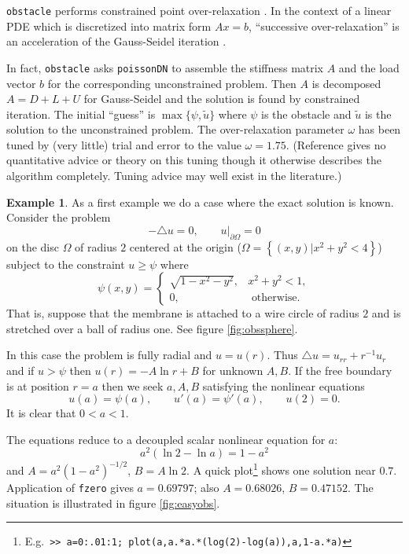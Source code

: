 \documentclass[12pt,final]{amsart}
\newcommand{\mtt}{\texttt}
\theoremstyle{definition}
\newtheorem{example}{Example}
\newcommand{\lap}{\triangle}
\begin{document}
\mtt{obstacle} performs constrained point over-relaxation \cite{GLT}.  In the context of a linear PDE which is discretized into matrix form $Ax=b$, ``successive over-relaxation'' is an acceleration of the Gauss-Seidel iteration \cite{BurdenFaires}.

In fact, \mtt{obstacle} asks \mtt{poissonDN} to assemble the stiffness matrix $A$ and the load vector $b$ for the corresponding unconstrained problem.  Then $A$ is decomposed $A=D+L+U$ for Gauss-Seidel and the solution is found by constrained iteration.  The initial ``guess'' is $\max\{\psi,\tilde u\}$ where $\psi$ is the obstacle and $\tilde u$ is the solution to the unconstrained problem.  The over-relaxation parameter $\omega$ has been tuned by (very little) trial and error to the value $\omega=1.75$.  (Reference \cite{GLT} gives no quantitative advice or theory on this tuning though it otherwise describes the algorithm completely.  Tuning advice may well exist in the literature.)

\begin{example}  As a first example we do a case where the exact solution is known.  Consider the problem
    $$-\lap u = 0, \qquad u\big|_{\partial\Omega} = 0$$
on the disc $\Omega$ of radius $2$ centered at the origin ($\Omega = \left\{(x,y) \big| x^2+y^2<4\right\}$) subject to the constraint $u\ge \psi$ where
    $$\psi(x,y) = \begin{cases} \sqrt{1-x^2-y^2}, & x^2+y^2 <1, \\ 0, & \text{ otherwise.}\end{cases}$$
That is, suppose that the membrane is attached to a wire circle of radius $2$ and is stretched over a ball of radius one.  See figure \ref{fig:obssphere}.

In this case the problem is fully radial and $u=u(r)$.  Thus $\lap u = u_{rr} + r^{-1} u_r$ and if $u>\psi$ then $u(r) = -A\ln r + B$ for unknown $A,B$.  If the free boundary is at position $r=a$ then we seek $a,A,B$ satisfying the nonlinear equations
    $$u(a) = \psi(a), \qquad u'(a) = \psi'(a), \qquad u(2) = 0.$$
It is clear that $0<a<1$.

The equations reduce to a decoupled scalar nonlinear equation for $a$:
\begin{equation}\label{exactfora}
a^2 (\ln 2 - \ln a) = 1-a^2
\end{equation}
and $A=a^2 (1-a^2)^{-1/2}$, $B= A \ln 2$.  A quick plot\footnote{E.g.~\mtt{>> a=0:.01:1; plot(a,a.*a.*(log(2)-log(a)),a,1-a.*a)}} shows one solution near $0.7$.  Application of \mtt{fzero} gives $a=0.69797$; also $A=0.68026$, $B=0.47152$.  The situation is illustrated in figure \ref{fig:easyobs}.
\end{example}
\end{document}
